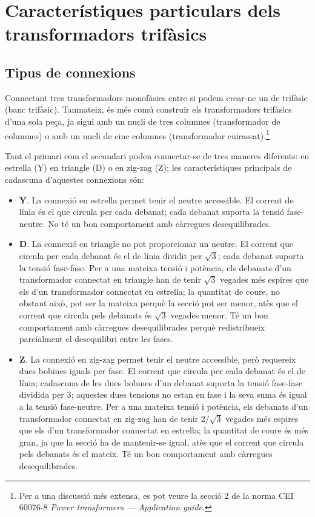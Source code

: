 \section{Característiques particulars  dels transformadors trifàsics}\label{sec:caract-trans-trif}

\subsection{Tipus de connexions}


Connectant tres transformadors monofàsics entre si podem crear-ne un de trifàsic (banc trifàsic). Tanmateix, és més comú construir els transformadors trifàsics d'una sola peça, ja sigui amb un nucli de tres columnes (transformador de columnes) o amb un nucli de cinc columnes (transformador cuirassat).\footnote{Per a una discussió més extensa, es pot veure la secció 2 de la norma CEI 60076-8 \emph{Power transformers --- Application guide}.}

Tant el primari com el secundari poden connectar-se de tres maneres diferents: en estrella (Y) en triangle (D) o en zig-zag (Z); les característiques principals de cadascuna d'aquestes connexions són:

\begin{itemize}
   \item \textbf{Y}. La connexió en estrella permet tenir el neutre accessible. El corrent de línia és el que circula per cada debanat; cada debanat suporta la tensió fase-neutre. No té un bon comportament amb càrregues desequilibrades.
   \item \textbf{D}. La connexió en triangle no pot proporcionar un neutre. El corrent que circula per cada debanat és el de línia dividit per $\sqrt{3}$; cada debanat suporta la tensió fase-fase. Per a una mateixa tensió i potència, els debanats d'un transformador connectat en triangle han de tenir $\sqrt{3}$ vegades més espires que els d'un transformador connectat en estrella; la quantitat de coure, no obstant això, pot ser la mateixa perquè la secció pot ser menor, atès que el corrent que circula pels debanats és $\sqrt{3}$ vegades menor. Té un bon comportament amb càrregues desequilibrades perquè redistribueix parcialment el desequilibri entre les fases.
   \item \textbf{Z}. La connexió en zig-zag permet tenir el neutre accessible, però requereix dues bobines iguals per fase. El corrent que circula per cada debanat és el de línia; cadascuna de les dues bobines d'un debanat suporta la tensió fase-fase dividida per 3; aquestes dues tensions no estan en fase i la seva suma és igual a la tensió fase-neutre. Per a una mateixa tensió i potència, els debanats d'un transformador connectat en zig-zag han de tenir $2/\sqrt{3}$ vegades més espires que els d'un transformador connectat en estrella; la quantitat de coure és més gran, ja que la secció ha de mantenir-se igual, atès que el corrent que circula pels debanats és el mateix. Té un bon comportament amb càrregues desequilibrades.
\end{itemize}

